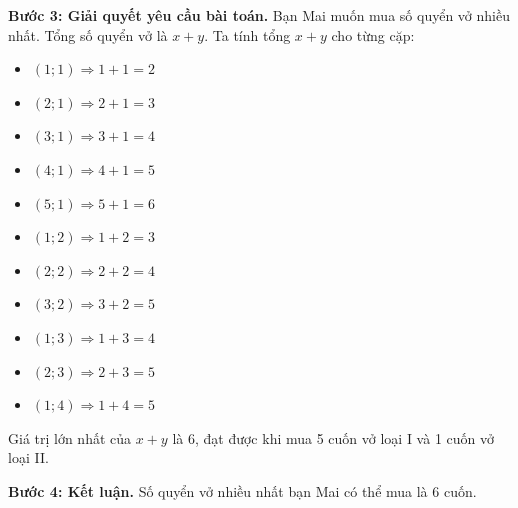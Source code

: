 \begin{vidumau}
{\textbf{Bước 3: Giải quyết yêu cầu bài toán.}
Bạn Mai muốn mua số quyển vở nhiều nhất. Tổng số quyển vở là $x+y$.
Ta tính tổng $x+y$ cho từng cặp:
\begin{itemize}
    \item $(1;1) \Rightarrow 1+1=2$
    \item $(2;1) \Rightarrow 2+1=3$
    \item $(3;1) \Rightarrow 3+1=4$
    \item $(4;1) \Rightarrow 4+1=5$
    \item $(5;1) \Rightarrow 5+1=6$
    \item $(1;2) \Rightarrow 1+2=3$
    \item $(2;2) \Rightarrow 2+2=4$
    \item $(3;2) \Rightarrow 3+2=5$
    \item $(1;3) \Rightarrow 1+3=4$
    \item $(2;3) \Rightarrow 2+3=5$
    \item $(1;4) \Rightarrow 1+4=5$
\end{itemize}
Giá trị lớn nhất của $x+y$ là $6$, đạt được khi mua 5 cuốn vở loại I và 1 cuốn vở loại II.

\textbf{Bước 4: Kết luận.}
Số quyển vở nhiều nhất bạn Mai có thể mua là 6 cuốn.
}
\end{vidumau}

